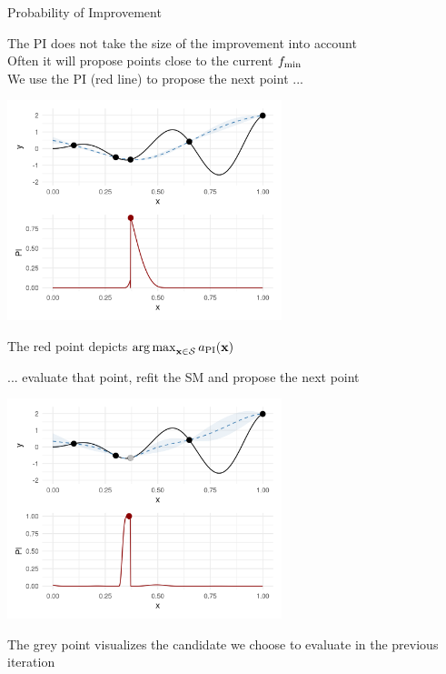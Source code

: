 \documentclass[11pt,compress,t,notes=noshow, xcolor=table]{beamer}
\begin{document}
\begin{vbframe}{Probability of Improvement}
\framebreak

The PI does not take the size of the improvement into account\\
Often it will propose points close to the current $f_{\min}$\\
\vspace{1em}
We use the PI (red line) to propose the next point ...
\vspace{-1em}
\begin{center}
  \includegraphics[width = 0.6\textwidth]{figure_man/bayesian_loop_pi_1.png}
\end{center}

The red point depicts $\operatorname{arg\,max}_{\mathbf{x} \in \mathcal{S}} a_{\text{PI}}(\mathbf{x})$

\framebreak

... evaluate that point, refit the SM and propose the next point

\begin{center}
  \includegraphics[width = 0.6\textwidth]{figure_man/bayesian_loop_pi_2.png}
\end{center}

The grey point visualizes the candidate we choose to evaluate in the previous iteration

\end{vbframe}
\end{document}
